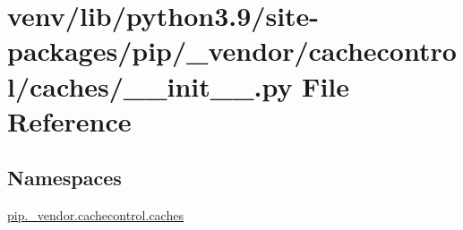 \hypertarget{venv_2lib_2python3_89_2site-packages_2pip_2__vendor_2cachecontrol_2caches_2____init_____8py}{}\section{venv/lib/python3.9/site-\/packages/pip/\+\_\+vendor/cachecontrol/caches/\+\_\+\+\_\+init\+\_\+\+\_\+.py File Reference}
\label{venv_2lib_2python3_89_2site-packages_2pip_2__vendor_2cachecontrol_2caches_2____init_____8py}
\subsection*{Namespaces}
\begin{DoxyCompactItemize}
\item 
 \hyperlink{namespacepip_1_1__vendor_1_1cachecontrol_1_1caches}{pip.\+\_\+vendor.\+cachecontrol.\+caches}
\end{DoxyCompactItemize}
